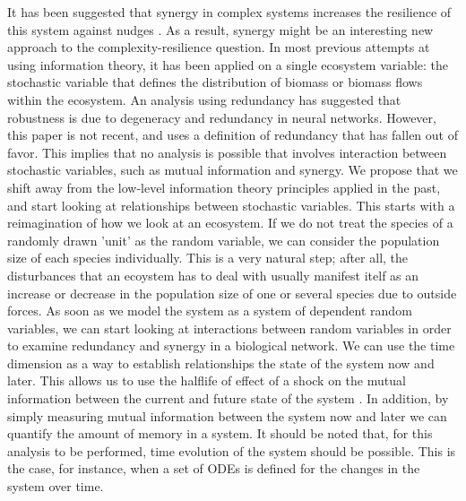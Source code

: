 \documentclass[../main.tex]{subfiles}
\begin{document}
It has been suggested that synergy in complex systems increases the resilience of this system against nudges \cite{quax2017quantifying}.
As a result, synergy might be an interesting new approach to the complexity-resilience question.
In most previous attempts at using information theory, it has been applied on a single ecosystem variable: the stochastic variable that defines the distribution of biomass or biomass flows within the ecosystem.
An analysis using redundancy has suggested that robustness is due to degeneracy and redundancy in neural networks.
However, this paper is not recent, and uses a definition of redundancy that has fallen out of favor.
This implies that no analysis is possible that involves interaction between stochastic variables, such as mutual information and synergy.
We propose that we shift away from the low-level information theory principles applied in the past, and start looking at relationships between stochastic variables.
This starts with a reimagination of how we look at an ecosystem.
If we do not treat the species of a randomly drawn 'unit' as the random variable, we can consider the population size of each species individually.
This is a very natural step; after all, the disturbances that an ecoystem has to deal with usually manifest itelf as an increase or decrease in the population size of one or several species due to outside forces.
As soon as we model the system as a system of dependent random variables, we can start looking at interactions between random variables in order to examine redundancy and synergy in a biological network.
We can use the time dimension as a way to establish relationships the state of the system now and later.
This allows us to use the halflife of effect of a shock on the mutual information between the current and future state of the system \cite{QuaxPersonal}.
In addition, by simply measuring mutual information between the system now and later we can quantify the amount of memory in a system.
It should be noted that, for this analysis to be performed, time evolution of the system should be possible.
This is the case, for instance, when a set of ODEs is defined for the changes in the system over time.
\end{document}
